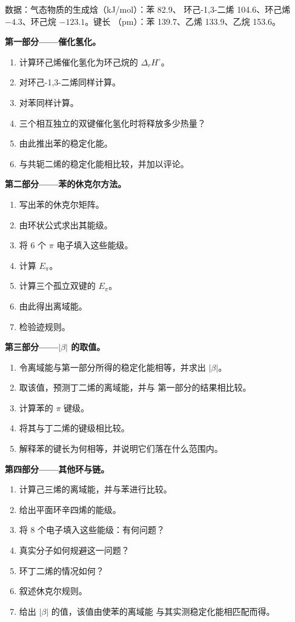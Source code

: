 \begin{problem}
\label{pb:b2:huckel:1}
数据：气态物质的生成焓（\unit{kJ/mol}）：苯 82.9、
环己-1,3-二烯 104.6、环己烯 $-4.3$、环己烷 $-123.1$。键长
（pm）：苯 139.7、乙烯 133.9、乙烷 153.6。

\medskip
\noindent\textbf{第一部分——催化氢化。}
\begin{enumerate}
  \item 计算环己烯催化氢化为环己烷的 $\Delta_r H^\circ$。
  \item 对环己-1,3-二烯同样计算。
  \item 对苯同样计算。
  \item 三个相互独立的双键催化氢化时将释放多少热量？
  \item 由此推出苯的稳定化能。
  \item 与共轭二烯的稳定化能相比较，并加以评论。
\end{enumerate}

\medskip
\noindent\textbf{第二部分——苯的休克尔方法。}
\begin{enumerate}[resume]
  \item 写出苯的休克尔矩阵。
  \item 由环状公式求出其能级。
  \item 将 6 个 $\pi$ 电子填入这些能级。
  \item 计算 $E_\pi$。
  \item 计算三个孤立双键的 $E_\pi$。
  \item 由此得出离域能。
  \item 检验迹规则。
\end{enumerate}

\medskip
\noindent\textbf{第三部分——$|\beta|$ 的取值。}
\begin{enumerate}[resume]
  \item 令离域能与第一部分所得的稳定化能相等，并求出
        $|\beta|$。
  \item 取该值，预测丁二烯的离域能，并与
        第一部分的结果相比较。
  \item 计算苯的 $\pi$ 键级。
  \item 将其与丁二烯的键级相比较。
  \item 解释苯的键长为何相等，并说明它们落在什么范围内。
\end{enumerate}

\medskip
\noindent\textbf{第四部分——其他环与链。}
\begin{enumerate}[resume]
  \item 计算己三烯的离域能，并与苯进行比较。
  \item 给出平面环辛四烯的能级。
  \item 将 8 个电子填入这些能级：有何问题？
  \item 真实分子如何规避这一问题？
  \item 环丁二烯的情况如何？
  \item 叙述休克尔规则。
  \item 给出 $|\beta|$ 的值，该值由使苯的离域能
        与其实测稳定化能相匹配而得。
\end{enumerate}
\end{problem}

